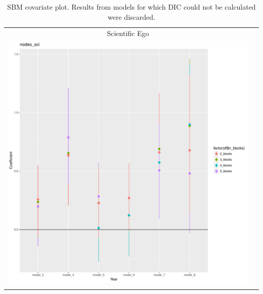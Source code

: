 \documentclass[fleqn,12pt]{wlscirep}
\begin{document}
\clearpage
\begin{longtable}[!h]{c@{\hskip 0cm}c}
Scientific Ego \\
\includegraphics[height=.75\textheight, clip=true, trim=.5cm .5cm 0cm .6cm]{figures/rl_plots2/nodeo_sci.pdf}   \\
\caption{\label{fig:SBM_plot_sci} SBM covariate plot. Results from models for which DIC could not be calculated were discarded.}
\end{longtable}
\end{document}
